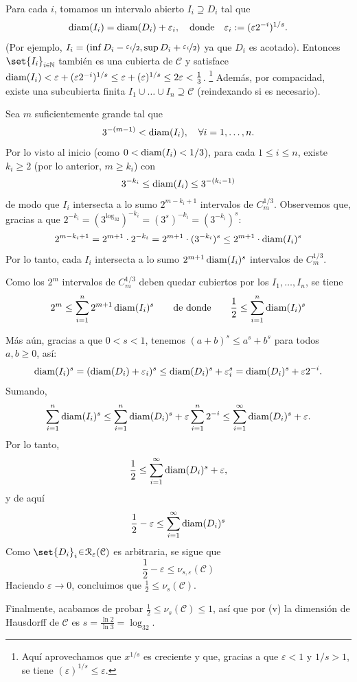 \begin{sol}
\begin{enumerate}[label = (\roman*), leftmargin=1.5em]
Para cada $i$, tomamos un intervalo abierto $I_i \supseteq D_i$ tal que
\[
\operatorname{diam}(I_i)
= \operatorname{diam}(D_i) + \varepsilon_i,
\quad \text{donde} \quad
\varepsilon_i := (\varepsilon 2^{-i})^{1/s}.
\]
(Por ejemplo, $I_i = (\inf D_i - \nicefrac{\varepsilon_i}{2},\sup D_i+\nicefrac{\varepsilon_i}{2})$ ya que $D_i$ es acotado).
Entonces $\set{I_i}_{i\en\mathbb{N}}$ también es una cubierta de $\mathcal{C}$ y satisface $\operatorname{diam}(I_i) < \varepsilon + (\varepsilon 2^{-i})^{1/s} \le \varepsilon+(\varepsilon)^{1/s} \le 2\varepsilon< \tfrac{1}{3}$.%
\footnote{
    Aquí aprovechamos que $x^{1/s}$ es creciente y que, gracias a que $\varepsilon<1$ y $1/s >1$, se tiene $(\varepsilon)^{1/s} \le \varepsilon$.
}
Además, por compacidad, existe una subcubierta finita $I_1\cup\dots\cup I_n \supseteq \mathcal{C}$ (reindexando si es necesario).\par
Sea $m$ suficientemente grande tal que
\[
3^{-(m-1)} < \operatorname{diam}(I_i),
\quad \forall i=1,\dots,n.
\]
Por lo visto al inicio (como $0<\operatorname{diam}(I_i) < 1/3$), para cada $1 \le i \le n$, existe $k_i\ge 2$ (por lo anterior, $m \ge k_i$) con
\[
3^{-k_i} \le \operatorname{diam}(I_i) \le 3^{-(k_i-1)}
\]
de modo que $I_i$ intersecta a lo sumo $2^{m-k_i+1}$ intervalos de $C^{1/3}_m$. Observemos que, gracias a que $2^{-k_i} = (3^{\log_32})^{-k_i} = (3^s)^{-k_i} = (3^{-k_i})^s$:
\[
2^{m-k_i+1}
= 2^{m+1} \cdot 2^{-k_i}
= 2^{m+1} \cdot (3^{-k_i})^s
\le 2^{m+1} \cdot \operatorname{diam}(I_i)^s
\]
Por lo tanto, cada $I_i$ intersecta a lo sumo $2^{m+1} \operatorname{diam}(I_i)^s$ intervalos de $C^{1/3}_m$.

Como los $2^m$ intervalos de $C^{1/3}_m$ deben quedar cubiertos por los $I_1,\dots,I_n$, se tiene
\[
2^m \le \sum_{i=1}^n 2^{m+1}\operatorname{diam}(I_i)^s
\qquad\text{de donde}\qquad
\frac{1}{2} \le \sum_{i=1}^n \operatorname{diam}(I_i)^s
\]

\medskip
Más aún, gracias a que $0 < s <1$, tenemos $(a+b)^s \le a^s + b^s$ para todos $a,b \ge 0$, así:
\[
\operatorname{diam}(I_i)^s
=(\operatorname{diam}(D_i) + \varepsilon_i)^s
\le \operatorname{diam}(D_i)^s + \varepsilon_i^s
= \operatorname{diam}(D_i)^s + \varepsilon 2^{-i}.
\]
Sumando,
\[
\sum_{i=1}^n \operatorname{diam}(I_i)^s
\le \sum_{i=1}^n \operatorname{diam}(D_i)^s
+ \varepsilon \sum_{i=1}^n 2^{-i}
\le \sum_{i=1}^\infty \operatorname{diam}(D_i)^s + \varepsilon.
\]
Por lo tanto,
\[
\frac{1}{2}
\le \sum_{i=1}^\infty \operatorname{diam}(D_i)^s + \varepsilon,
\]
y de aquí
\[
\frac{1}{2} - \varepsilon
\leq
\sum_{i=1}^\infty \operatorname{diam}(D_i)^s
\]
Como $\set{D_i}_i\en\mathcal{R}_\varepsilon(\mathcal{C})$ es arbitraria, se sigue que
\[
\frac{1}{2} - \varepsilon\le\nu_{s,\varepsilon}(\mathcal{C}) 
\]
Haciendo $\varepsilon \to 0$, concluimos que $\frac{1}{2} \le \nu_s(\mathcal{C})$.

\medskip
Finalmente, acabamos de probar $\frac{1}{2} \le \nu_s(\mathcal{C}) \le 1$, así que por (v) la dimensión de Hausdorff de $\mathcal{C}$ es $s = \frac{\ln 2}{\ln 3} = \log_32$.
\end{enumerate}
\end{sol}